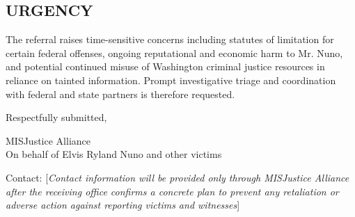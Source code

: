 \documentclass[12pt,oneside]{article}
\begin{document}
\begin{flushleft}
\section*{URGENCY}

The referral raises time-sensitive concerns including statutes of limitation for certain federal offenses, ongoing reputational and economic harm to Mr. Nuno, and potential continued misuse of Washington criminal justice resources in reliance on tainted information. Prompt investigative triage and coordination with federal and state partners is therefore requested.

\vspace{0.3in}

\noindent
Respectfully submitted,

\vspace{0.3in}

\noindent
MISJustice Alliance \\
On behalf of Elvis Ryland Nuno and other victims

\vspace{0.2in}

\noindent
Contact: [\textit{Contact information will be provided only through MISJustice Alliance after the receiving office confirms a concrete plan to prevent any retaliation or adverse action against reporting victims and witnesses}]

\end{flushleft}
\end{document}
